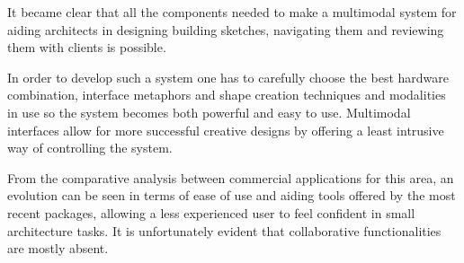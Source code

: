 
It became clear that all the components needed to make a multimodal system
for aiding architects in designing building sketches, navigating them and reviewing
them with clients is possible.

In order to develop such a system one has to carefully choose the best hardware
combination, interface metaphors and shape creation techniques and modalities in
use so the system becomes both powerful and easy to use.
Multimodal interfaces allow for more successful creative designs by offering a least intrusive
way of controlling the system. 

From the comparative analysis between commercial applications for this area,
an evolution can be seen in terms of ease of use and aiding tools offered by the most recent
packages, allowing a less experienced user to feel confident in small architecture tasks.
It is unfortunately evident that collaborative functionalities are mostly absent.

